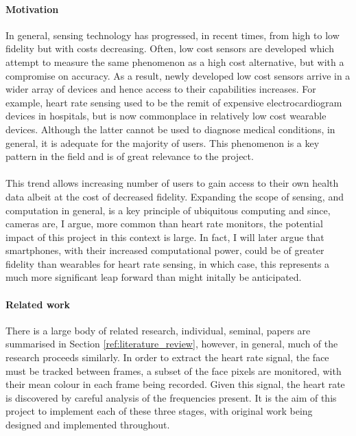 \paragraph{Motivation}
In general, sensing technology has progressed, in recent times, from high to low fidelity but with costs decreasing.
Often, low cost sensors are developed which attempt to measure the same phenomenon as a high cost alternative, but with a compromise on accuracy.
As a result, newly developed low cost sensors arrive in a wider array of devices and hence access to their capabilities increases.
For example, heart rate sensing used to be the remit of expensive electrocardiogram devices in hospitals, but is now commonplace in relatively low cost wearable devices. Although the latter cannot be used to diagnose medical conditions, in general, it is adequate for the majority of users. This phenomenon
is a key pattern in the field and is of great relevance to the project.
\\\\
This trend allows increasing number of users to gain access to their own health data albeit at the cost of decreased fidelity.
Expanding the scope of sensing, and computation in general, is a key principle of ubiquitous computing and since, cameras are, I argue, more common than heart rate monitors, the potential impact of this project in this context is large. 
In fact, I will later argue that smartphones, with their increased computational power, 
could be of greater fidelity than wearables for heart rate sensing, in which case, this represents a much more significant 
leap forward than might initally be anticipated.

\paragraph{Related work}
There is a large body of related research,
individual, seminal, papers are summarised in Section \ref{ref:literature_review}, however, in general, much of the research proceeds similarly. 
In order to extract the heart rate signal, the face must be tracked between frames, a subset of the face pixels are monitored, with their mean colour in each frame being recorded.
Given this signal, the heart rate is discovered by careful analysis of the frequencies present. 
It is the aim of this project to implement each of these three stages, with original work being designed and implemented throughout. 




